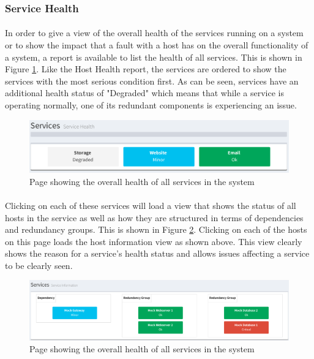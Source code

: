 \documentclass[bsc,logo,twoside,singlespacing,notimes]{infthesis}
\begin{document}
\subsubsection{Service Health}
\paragraph*{}
	In order to give a view of the overall health of the services running on a
	system or to show the impact that a fault with a host has on the overall
	functionality of a system, a report is available to list the health of all
	services.  This is shown in Figure \ref{service-health-index}. Like the
	Host Health report, the services are ordered to show the services with the most
	serious condition first.  As can be seen, services have an additional health
	status of "Degraded" which means that while a service is operating normally,
	one of its redundant components is experiencing an issue.

\begin{figure}[H]
	\centering
	\caption{Page showing the overall health of all services in the system}
	\label{service-health-index}
	\includegraphics[scale=0.6]{assets/screenshots/service-health-index.pdf}
\end{figure}

\paragraph*{}
	Clicking on each of these services will load a view that shows the status of
	all hosts in the service as well as how they are structured in terms of
	dependencies and redundancy groups.  This is shown in Figure
	\ref{service-information}.  Clicking on each of the hosts on this page loads
	the host information view as shown above.  This view clearly shows the reason
	for a service's health status and allows issues affecting a service to be
	clearly seen.

\begin{figure}[H]
	\centering
	\caption{Page showing the overall health of all services in the system}
	\label{service-information}
	\includegraphics[scale=0.44]{assets/screenshots/service-information.pdf}
\end{figure}
\end{document}
